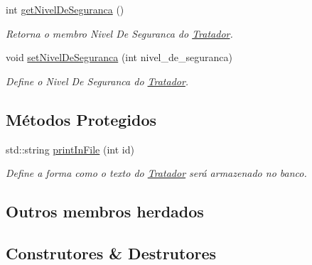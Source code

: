 \begin{DoxyCompactItemize}
int \hyperlink{classTratador_a22ba37b0fd4b7adbd0b52de0d695c01a}{get\+Nivel\+De\+Seguranca} ()
\begin{DoxyCompactList}\small\item\em Retorna o membro Nivel De Seguranca do \hyperlink{classTratador}{Tratador}. \end{DoxyCompactList}\item 
void \hyperlink{classTratador_a508aa328b9235c262c74064c95357976}{set\+Nivel\+De\+Seguranca} (int nivel\+\_\+de\+\_\+seguranca)
\begin{DoxyCompactList}\small\item\em Define o Nivel De Seguranca do \hyperlink{classTratador}{Tratador}. \end{DoxyCompactList}\end{DoxyCompactItemize}
\subsection*{Métodos Protegidos}
\begin{DoxyCompactItemize}
\item 
std\+::string \hyperlink{classTratador_af2efc58696c20320f51741d01a958ef7}{print\+In\+File} (int id)
\begin{DoxyCompactList}\small\item\em Define a forma como o texto do \hyperlink{classTratador}{Tratador} será armazenado no banco. \end{DoxyCompactList}\end{DoxyCompactItemize}
\subsection*{Outros membros herdados}


\subsection{Construtores \& Destrutores}
\mbox{\label{classTratador_ac77f42836921173475b8e5f98807505e}} 
